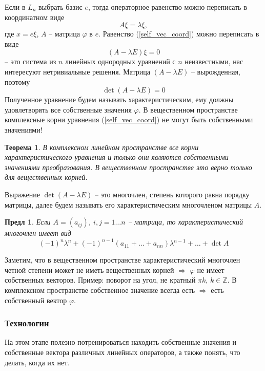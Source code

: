 \documentclass[a4paper,12pt]{article}
\newtheorem{theorem}{Теорема}[section]
\newtheorem{propos}{Предл}[section]
\begin{document}
Если в $L_n$ выбрать базис $e$, тогда операторное равенство можно переписать в координатном виде
\begin{equation} \label{self_vec_coord}
	A \xi = \lambda \xi,
\end{equation}
где $x = e \xi$, $A$ -- матрица $\varphi$ в $e$. Равенство (\ref{self_vec_coord}) можно переписать в виде 
\begin{equation}
	(A - \lambda E) \xi = 0
\end{equation}
-- это система из $n$ линейных однородных уравнений с $n$ неизвестными, нас интересуют нетривиальные решения. Матрица $(A - \lambda E)$ -- вырожденная, поэтому 
\begin{equation}
	\det (A - \lambda E) = 0
\end{equation}
Полученное уравнение будем называть характеристическим, ему должны удовлетворять все собственные значения $\varphi$. В вещественном пространстве комплексные корни уравнения (\ref{self_vec_coord}) не могут быть собственными значениями!

\begin{theorem}
	В комплексном линейном пространстве все корни характеристического уравнения и только они являются собственными значениями преобразования. В вещественном пространстве это верно только для вещественных корней.
\end{theorem}

Выражение $\det (A - \lambda E)$ -- это многочлен, степень которого равна порядку матрицы, далее будем называть его характеристическим многочленом матрицы $A$.

\begin{propos}
	Если $A = (a_{ij})$, $i,j = 1 \ldots n$ -- матрица, то характеристический многочлен имеет вид
	\[
		(-1)^n \lambda^n + (-1)^{n-1} (a_{11} + \ldots +  a_{nn}) \lambda^{n-1} + \ldots + \det A
	\]
\end{propos}

Заметим, что в вещественном пространстве характеристический многочлен четной степени может не иметь вещественных корней $\Rightarrow$ $\varphi$ не имеет собственных векторов. Пример: поворот на угол, не кратный $\pi k$, $k \in \mathbb{Z}$. В комплексном пространстве собственное значение всегда есть $\Rightarrow$ есть собственный вектор $\varphi$.

\subsubsection{Технологии}
На этом этапе полезно потренироваться находить собственные значения и собственные вектора различных линейных операторов, а также понять, что делать, когда их нет.
\end{document}
